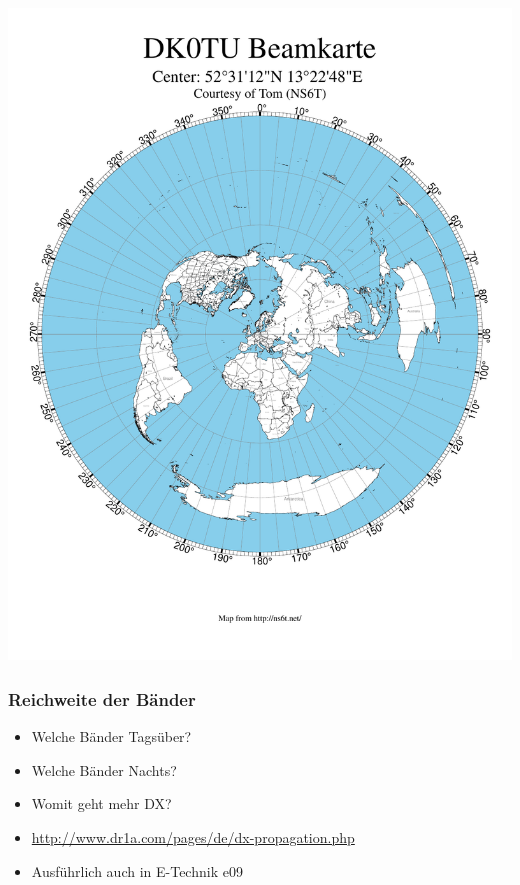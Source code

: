 \begin{frame}
        \begin{center}
        \includegraphics[height=1.2\textheight]{a08/AzimuthalMap.pdf}
    \end{center}
\end{frame}

\begin{frame}
    \frametitle{Reichweite der Bänder}
    \begin{center}
    \begin{itemize}
    			\item Welche Bänder Tagsüber?
    			\item Welche Bänder Nachts?
    			\item Womit geht mehr DX?
    			\item \url{http://www.dr1a.com/pages/de/dx-propagation.php}
    			\item Ausführlich auch in E-Technik e09
    \end{itemize}
    \end{center}
\end{frame}

